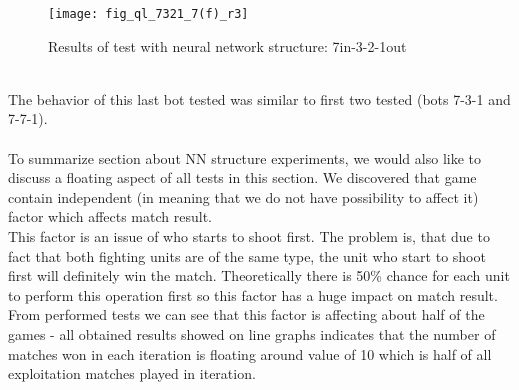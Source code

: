 \begin{figure}[htp]
\centerline{\texttt{[image: fig\_ql\_7321\_7(f)\_r3]}}
\caption{Results of test with neural network structure: 7in-3-2-1out}
\label{fig:nnf}
\end{figure}
\hfill \\ \hphantom{x}
The behavior of this last bot tested was similar to first two tested (bots 7-3-1 and 7-7-1).
\\ \\ \hphantom{x}
To summarize section about NN structure experiments, we would also like to discuss a floating aspect of all tests in this section. We discovered that game contain independent (in meaning that we do not have possibility to affect it) factor which affects match result.
\\ \hphantom{x}
This factor is an issue of who starts to shoot first. The problem is, that due to fact that both fighting units are of the same type, the unit who start to shoot first will definitely win the match. Theoretically there is 50\% chance for each unit to perform this operation first so this factor has a huge impact on match result.
\\ \hphantom{x}
From performed tests we can see that this factor is affecting about half of the games - all obtained results showed on line graphs indicates that the number of matches won in each iteration is floating around value of 10 which is half of all exploitation matches played in iteration.

